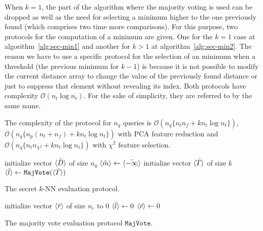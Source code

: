 When $k=1$, the part of the algorithm where the majority voting is used can be dropped as well as the need for selecting a minimum higher to the one previously found (which comprises two time more comparisons). For this purpose, two protocols for the computation of a minimum are given. One for the $k=1$ case at algorithm~\ref{alg:sec-min1} and another for $k>1$ at algorithm~\ref{alg:sec-min2}. The reason we have to use a specific protocol for the selection of an minimum when a threshold (the previous minimum for $k-1$) is because it is not possible to modify the current distance array to change the value of the previously found distance or just to suppress that element without revealing its index. Both protocols have complexity $\mathcal{O}(n_t \log n_t)$. For the sake of simplicity, they are referred to by the same name.

The complexity of the protocol for $n_q$ queries is $\mathcal{O}(n_q\{n_tn_f + kn_t \log n_t\})$, $\mathcal{O}(n_q\{n_p(n_t+n_f) + kn_t \log n_t\})$ with PCA feature reduction and $\mathcal{O}(n_q\{n_tn_{\chi^2} + kn_t \log n_t\})$ with $\chi^2$ feature selection.

\begin{center}
\begin{algorithm}[H]
\DontPrintSemicolon
initialize vector $\langle \tilde{D} \rangle$ of size $n_q$ \;
$\langle \tilde{m} \rangle \leftarrow \langle \bar{-\infty} \rangle$ \;
initialize vector $\langle \bar{T} \rangle$ of size $k$ \;
$\langle \bar{l} \rangle \leftarrow \mathtt{MajVote}(\langle \bar{T} \rangle)$ \;
\caption{The secret $k$-NN evaluation protocol.}
\label{alg:sec-knn}
\end{algorithm}
\end{center}

\begin{center}
\begin{algorithm}[H]
\DontPrintSemicolon
initialize vector $\langle \bar{r} \rangle$ of size $n_c$ to 0\;
$\langle \bar{l} \rangle \leftarrow 0$ \;
$\langle \bar{c} \rangle \leftarrow 0$ \;
\caption{The majority vote evaluation protocol $\mathtt{MajVote}$.}
\label{alg:sec-win}
\end{algorithm}
\end{center}


